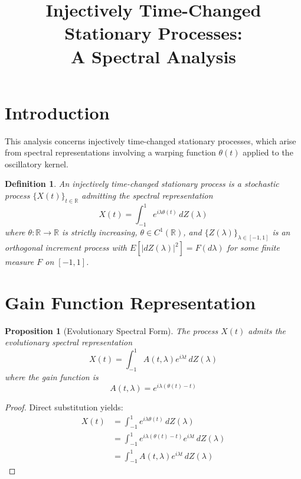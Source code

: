 \documentclass[11pt]{article}
\title{Injectively Time-Changed Stationary Processes:\\ A Spectral Analysis}
\author{}
\date{}
\newtheorem{proposition}{Proposition}
\newtheorem{definition}{Definition}
\begin{document}
\maketitle

\section{Introduction}

This analysis concerns injectively time-changed stationary processes, which arise from spectral representations involving a warping function $\theta(t)$ applied to the oscillatory kernel.

\begin{definition}
An \emph{injectively time-changed stationary process} is a stochastic process $\{X(t)\}_{t \in \mathbb{R}}$ admitting the spectral representation
\begin{equation}
X(t) = \int_{-1}^1 e^{i\lambda\theta(t)} \, dZ(\lambda)
\end{equation}
where $\theta: \mathbb{R} \to \mathbb{R}$ is strictly increasing, $\theta \in C^1(\mathbb{R})$, and $\{Z(\lambda)\}_{\lambda \in [-1,1]}$ is an orthogonal increment process with $E[|dZ(\lambda)|^2] = F(d\lambda)$ for some finite measure $F$ on $[-1,1]$.
\end{definition}

\section{Gain Function Representation}

\begin{proposition}[Evolutionary Spectral Form]
The process $X(t)$ admits the evolutionary spectral representation
\begin{equation}
X(t) = \int_{-1}^1 A(t,\lambda) e^{i\lambda t} \, dZ(\lambda)
\end{equation}
where the gain function is
\begin{equation}
A(t,\lambda) = e^{i\lambda(\theta(t)-t)}
\end{equation}
\end{proposition}

\begin{proof}
Direct substitution yields:
\begin{align}
X(t) &= \int_{-1}^1 e^{i\lambda\theta(t)} \, dZ(\lambda)\\
&= \int_{-1}^1 e^{i\lambda(\theta(t)-t)} e^{i\lambda t} \, dZ(\lambda)\\
&= \int_{-1}^1 A(t,\lambda) e^{i\lambda t} \, dZ(\lambda)
\end{align}
\end{proof}
\end{document}
